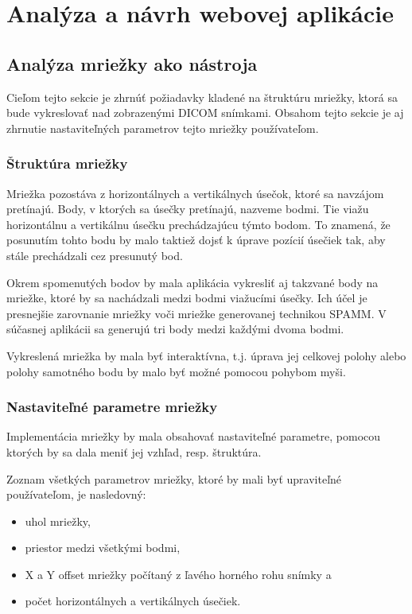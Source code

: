 \chapter {Analýza a návrh webovej aplikácie}

\section {Analýza mriežky ako nástroja}
Cieľom tejto sekcie je zhrnúť požiadavky kladené na štruktúru mriežky, ktorá sa bude vykreslovať nad zobrazenými DICOM snímkami. Obsahom tejto sekcie je aj zhrnutie nastaviteľných parametrov tejto mriežky používateľom.

\subsection {Štruktúra mriežky}
Mriežka pozostáva z horizontálnych a vertikálnych úsečok, ktoré sa navzájom pretínajú. Body, v ktorých sa  úsečky pretínajú, nazveme  bodmi. Tie viažu horizontálnu a vertikálnu úsečku prechádzajúcu týmto bodom. To znamená, že posunutím tohto bodu by malo taktiež dojsť k úprave pozícií úsečiek tak, aby stále prechádzali cez presunutý bod.

Okrem spomenutých bodov by mala aplikácia vykresliť aj takzvané  body na mriežke, ktoré by sa nachádzali medzi bodmi viažucími úsečky. Ich účel je presnejšie zarovnanie mriežky voči mriežke generovanej technikou SPAMM. V súčasnej aplikácii sa generujú tri  body medzi každými dvoma  bodmi.

Vykreslená mriežka by mala byť interaktívna, t.j. úprava jej celkovej polohy alebo polohy samotného bodu by malo byť možné pomocou pohybom myši.

\subsection {Nastaviteľné parametre mriežky}\label{grid_settings}
Implementácia mriežky by mala obsahovať nastaviteľné parametre, pomocou ktorých by sa dala meniť jej vzhľad, resp. štruktúra.

Zoznam všetkých parametrov mriežky, ktoré by mali byť upraviteľné používateľom, je nasledovný:
\begin {itemize}
\item {uhol mriežky,}
\item {priestor medzi všetkými bodmi,}
\item {X a Y offset mriežky počítaný z ľavého horného rohu snímky a}
\item {počet horizontálnych a vertikálnych úsečiek.}
\end {itemize}

